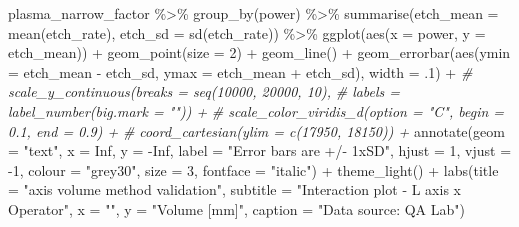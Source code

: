 \documentclass[
]{book}
\newenvironment{Shaded}{\begin{snugshade}}{\end{snugshade}}
\newcommand{\AttributeTok}[1]{\textcolor[rgb]{0.77,0.63,0.00}{#1}}
\newcommand{\CommentTok}[1]{\textcolor[rgb]{0.56,0.35,0.01}{\textit{#1}}}
\newcommand{\ConstantTok}[1]{\textcolor[rgb]{0.00,0.00,0.00}{#1}}
\newcommand{\DecValTok}[1]{\textcolor[rgb]{0.00,0.00,0.81}{#1}}
\newcommand{\FunctionTok}[1]{\textcolor[rgb]{0.00,0.00,0.00}{#1}}
\newcommand{\NormalTok}[1]{#1}
\newcommand{\SpecialCharTok}[1]{\textcolor[rgb]{0.00,0.00,0.00}{#1}}
\newcommand{\StringTok}[1]{\textcolor[rgb]{0.31,0.60,0.02}{#1}}
\begin{document}
\begin{Shaded}
\begin{Highlighting}[]
\NormalTok{plasma\_narrow\_factor }\SpecialCharTok{\%\textgreater{}\%}
  \FunctionTok{group\_by}\NormalTok{(power) }\SpecialCharTok{\%\textgreater{}\%}
  \FunctionTok{summarise}\NormalTok{(}\AttributeTok{etch\_mean =} \FunctionTok{mean}\NormalTok{(etch\_rate), }\AttributeTok{etch\_sd =} \FunctionTok{sd}\NormalTok{(etch\_rate)) }\SpecialCharTok{\%\textgreater{}\%}
  \FunctionTok{ggplot}\NormalTok{(}\FunctionTok{aes}\NormalTok{(}\AttributeTok{x =}\NormalTok{ power, }\AttributeTok{y =}\NormalTok{ etch\_mean)) }\SpecialCharTok{+}
  \FunctionTok{geom\_point}\NormalTok{(}\AttributeTok{size =} \DecValTok{2}\NormalTok{) }\SpecialCharTok{+}
  \FunctionTok{geom\_line}\NormalTok{() }\SpecialCharTok{+}
  \FunctionTok{geom\_errorbar}\NormalTok{(}\FunctionTok{aes}\NormalTok{(}\AttributeTok{ymin =}\NormalTok{ etch\_mean }\SpecialCharTok{{-}}\NormalTok{ etch\_sd, }
                    \AttributeTok{ymax =}\NormalTok{ etch\_mean }\SpecialCharTok{+}\NormalTok{ etch\_sd),}
                \AttributeTok{width =}\NormalTok{ .}\DecValTok{1}\NormalTok{) }\SpecialCharTok{+}
  \CommentTok{\# scale\_y\_continuous(breaks = seq(10000, 20000, 10),}
  \CommentTok{\#                    labels = label\_number(big.mark = "\textquotesingle{}")) +}
  \CommentTok{\# scale\_color\_viridis\_d(option = "C", begin = 0.1, end = 0.9) +}
  \CommentTok{\# coord\_cartesian(ylim = c(17950, 18150)) +}
  \FunctionTok{annotate}\NormalTok{(}\AttributeTok{geom =} \StringTok{"text"}\NormalTok{, }\AttributeTok{x =} \ConstantTok{Inf}\NormalTok{, }\AttributeTok{y =} \SpecialCharTok{{-}}\ConstantTok{Inf}\NormalTok{, }\AttributeTok{label =} \StringTok{"Error bars are +/{-} 1xSD"}\NormalTok{, }
    \AttributeTok{hjust =} \DecValTok{1}\NormalTok{, }\AttributeTok{vjust =} \SpecialCharTok{{-}}\DecValTok{1}\NormalTok{, }\AttributeTok{colour =} \StringTok{"grey30"}\NormalTok{, }\AttributeTok{size =} \DecValTok{3}\NormalTok{, }
    \AttributeTok{fontface =} \StringTok{"italic"}\NormalTok{) }\SpecialCharTok{+}
  \FunctionTok{theme\_light}\NormalTok{() }\SpecialCharTok{+}
  \FunctionTok{labs}\NormalTok{(}\AttributeTok{title =} \StringTok{"axis volume method validation"}\NormalTok{,}
       \AttributeTok{subtitle =} \StringTok{"Interaction plot {-} L axis x Operator"}\NormalTok{,}
       \AttributeTok{x =} \StringTok{""}\NormalTok{,}
       \AttributeTok{y =} \StringTok{"Volume [mm]"}\NormalTok{,}
       \AttributeTok{caption =} \StringTok{"Data source: QA Lab"}\NormalTok{)}
\end{Highlighting}
\end{Shaded}
\end{document}
